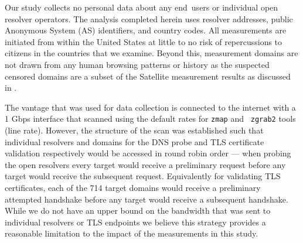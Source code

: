 Our study collects no personal data about any end~users or individual open
resolver operators. The analysis completed herein uses resolver addresses,
public Anonymous System (AS) identifiers, and country codes.  All measurements
are initiated from within the United States at little to no risk of
repercussions to citizens in the countries that we examine. Beyond this,
measurement domains are not drawn from any human browsing patterns or history
as the suspected censored domains are a subset of the Satellite measurement
results as discussed in .

The vantage that was used for data collection is connected to the internet with
a 1 Gbps interface that scanned using the default rates for {\tt zmap} and {\tt
zgrab2} tools (line rate). However, the structure of the scan was established
such that individual resolvers and domains for the DNS probe and TLS
certificate validation respectively would be accessed in round robin order ---
\ie when probing the open resolvers every target would receive a preliminary
request before any target would receive the subsequent request.  Equivalently
for validating TLS certificates, each of the 714 target domains would receive
a preliminary attempted handshake before any target would receive a subsequent
handshake. While we do not have an upper bound on the bandwidth that was sent
to individual resolvers or TLS endpoints we believe this strategy provides
a reasonable limitation to the impact of the measurements in this study.

